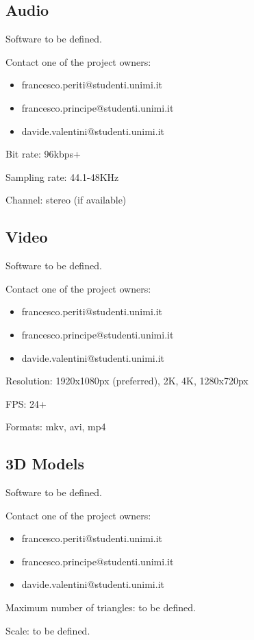 \documentclass[12pt]{article}
\begin{document}
\subsection{Audio}

Software to be defined.

Contact one of the project owners:
\begin{itemize}
	\item francesco.periti@studenti.unimi.it
	\item francesco.principe@studenti.unimi.it
	\item davide.valentini@studenti.unimi.it
\end{itemize}

Bit rate: 96kbps+

Sampling rate: 44.1-48KHz

Channel: stereo (if available)

\subsection{Video}
Software to be defined.

Contact one of the project owners:
\begin{itemize}
	\item francesco.periti@studenti.unimi.it
	\item francesco.principe@studenti.unimi.it
	\item davide.valentini@studenti.unimi.it
\end{itemize}

Resolution: 1920x1080px (preferred), 2K, 4K, 1280x720px

FPS: 24+

Formats: mkv, avi, mp4

\subsection{3D Models}
Software to be defined.

Contact one of the project owners:
\begin{itemize}
	\item francesco.periti@studenti.unimi.it
	\item francesco.principe@studenti.unimi.it
	\item davide.valentini@studenti.unimi.it
\end{itemize}

Maximum number of triangles: to be defined.

Scale: to be defined.
\end{document}

